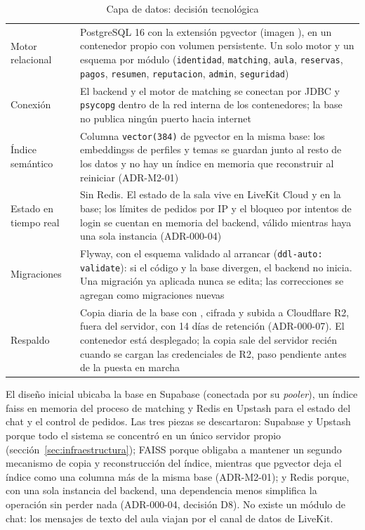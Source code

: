 \begin{table}[H]
    \centering
    \caption{Capa de datos: decisión tecnológica}
    \label{tab:stack-datos}
    \small
    \begin{tabularx}{\textwidth}{l L}
        \toprule
         &  \\
        \midrule
        Motor relacional & PostgreSQL 16 con la extensión pgvector (imagen ), en un contenedor propio con volumen persistente. Un solo motor y un esquema por módulo (\texttt{identidad}, \texttt{matching}, \texttt{aula}, \texttt{reservas}, \texttt{pagos}, \texttt{resumen}, \texttt{reputacion}, \texttt{admin}, \texttt{seguridad}) \\
        Conexión & El backend y el motor de \gls{matching} se conectan por JDBC y \texttt{psycopg} dentro de la red interna de los contenedores; la base no publica ningún puerto hacia internet \\
        Índice semántico & Columna \texttt{vector(384)} de pgvector en la misma base: los \glspl{embeddings} de perfiles y temas se guardan junto al resto de los datos y no hay un índice en memoria que reconstruir al reiniciar (ADR-M2-01) \\
        Estado en tiempo real & Sin Redis. El estado de la sala vive en LiveKit Cloud y en la base; los límites de pedidos por IP y el bloqueo por intentos de login se cuentan en memoria del backend, válido mientras haya una sola instancia (ADR-000-04) \\
        Migraciones & Flyway, con el esquema validado al arrancar (\texttt{ddl-auto: validate}): si el código y la base divergen, el backend no inicia. Una migración ya aplicada nunca se edita; las correcciones se agregan como migraciones nuevas \\
        Respaldo & Copia diaria de la base con , cifrada y subida a Cloudflare R2, fuera del servidor, con 14 días de retención (ADR-000-07). El contenedor está desplegado; la copia sale del servidor recién cuando se cargan las credenciales de R2, paso pendiente antes de la puesta en marcha \\
        \bottomrule
    \end{tabularx}
\end{table}

El diseño inicial ubicaba la base en Supabase (conectada por su
\emph{pooler}), un índice \gls{faiss} en memoria del proceso de \gls{matching}
y Redis en Upstash para el estado del chat y el control de pedidos. Las
tres piezas se descartaron: Supabase y Upstash porque todo el sistema se
concentró en un único servidor propio (sección~\ref{sec:infraestructura});
FAISS porque obligaba a mantener un segundo mecanismo de copia y
reconstrucción del índice, mientras que pgvector deja el índice como una
columna más de la misma base (ADR-M2-01); y Redis porque, con una sola
instancia del backend, una dependencia menos simplifica la operación sin
perder nada (ADR-000-04, decisión D8). No existe un módulo de chat: los
mensajes de texto del aula viajan por el canal de datos de LiveKit.

